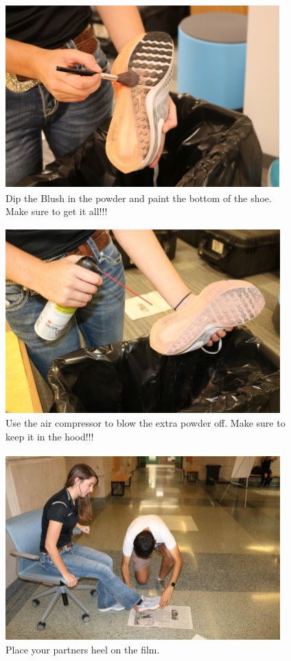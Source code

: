 \begin{figure}[!htp]
\centering
\includegraphics[scale=0.75]{Powder_Shoe}
\caption{Dip the Blush in the powder and paint the bottom of the shoe. Make sure to get it all!!!}
\label{img:Brush2}
\end{figure}

\begin{figure}[!htp]
\centering
\includegraphics[scale=0.75]{air}
\caption{Use the air compressor to blow the extra powder off. Make sure to keep it in the hood!!!}
\label{img:Brush2}
\end{figure}


\begin{figure}[!htp]
\centering
\includegraphics[scale=0.75]{Print_1}
\caption{Place your partners heel on the film.}
\label{img:Brush2}
\end{figure}

